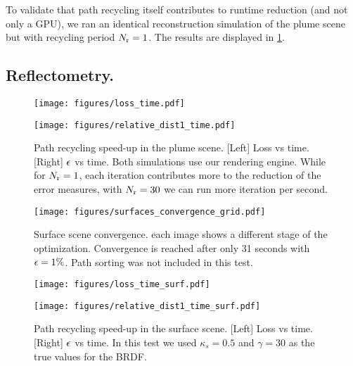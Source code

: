 \documentclass{article}
\begin{document}
To validate that path recycling itself contributes to runtime reduction (and not only a \ac{GPU}), we ran an identical reconstruction simulation of the plume scene but with recycling period $N_{\text{r}}=1$. The results are displayed in \fig\ref{fig:loss_reldist_convergence}.

\subsection{Reflectometry.}


\begin{figure}[t]
  \centering
  \begin{minipage}[b]{0.5\textwidth}
  \texttt{[image: figures/loss\_time.pdf]}
  \end{minipage}
    \begin{minipage}[b]{0.48\textwidth}
   \texttt{[image: figures/relative\_dist1\_time.pdf]}
  \end{minipage}
    \caption{Path recycling speed-up in the plume scene. [Left] Loss vs time. [Right] $\epsilon$ vs time. Both simulations use our rendering engine. While for $N_{\text{r}}=1$, each iteration contributes more to the reduction of the error measures, with $N_{\text{r}}=30$ we can run more iteration per second.}
    \label{fig:loss_reldist_convergence}
\end{figure}
\begin{figure}[t!]
  \centering
  \texttt{[image: figures/surfaces\_convergence\_grid.pdf]} 
    \caption{Surface scene convergence. each image shows a different stage of the optimization. Convergence is reached after only 31 seconds with $\epsilon=1\%$. Path sorting was not included in this test.}
    \label{fig:surface_convergence}
\end{figure} 
\begin{figure}[b!]
  \centering
  \begin{minipage}[b]{0.5\textwidth}
  \texttt{[image: figures/loss\_time\_surf.pdf]}
  \end{minipage}
    \begin{minipage}[b]{0.48\textwidth}
   \texttt{[image: figures/relative\_dist1\_time\_surf.pdf]}
  \end{minipage}
    \caption{Path recycling speed-up in the surface scene. [Left] Loss vs time. [Right] $\epsilon$ vs time. In this test we used $\kappa_s=0.5$ and $\gamma=30$ as the true values for the \ac{BRDF}.}
    \label{fig:loss_reldist_convergence_surfaces}
\end{figure}
\end{document}
